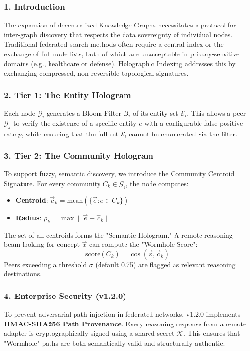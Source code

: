 \documentclass[10pt,journal,compsoc]{IEEEtran}
\begin{document}
\subsubsection{1. Introd\-uction}
The expansion of decen\-tralized Knowledge Graphs neces\-sitates a protocol for inter-graph discovery that respects the data sovereignty of individual nodes. Traditional federated search methods often require a central index or the exchange of full node lists, both of which are unacc\-eptable in privacy-sensitive domains (e.g., healthcare or defense). Holographic Indexing addresses this by exchanging compressed, non-reversible topological signatures.

\subsubsection{2. Tier 1: The Entity Hologram}
Each node $\mathcal{G}_i$ generates a Bloom Filter $B_i$ of its entity set $\mathcal{E}_i$. This allows a peer $\mathcal{G}_j$ to verify the existence of a specific entity $e$ with a confi\-gurable false-positive rate $p$, while ensuring that the full set $\mathcal{E}_i$ cannot be enumerated via the filter.

\subsubsection{3. Tier 2: The Community Hologram}
To support fuzzy, semantic discovery, we introduce the Community Centroid Signature. For every community $C_k \in \mathcal{G}_i$, the node computes:
\begin{itemize}
\item \textbf{Centroid}: $\vec{c}_k = \text{mean}(\{\vec{e} : e \in C_k\})$
\item \textbf{Radius}: $\rho_k = \max \|\vec{e} - \vec{c}_k\|$

\end{itemize}
The set of all centroids forms the "Semantic Hologram." A remote reasoning beam looking for concept $\vec{x}$ can compute the "Wormhole Score":
\begin{equation}
\text{score}(C_k) = \cos(\vec{x}, \vec{c}_k)
\end{equation}
Peers exceeding a threshold $\sigma$ (default 0.75) are flagged as relevant reasoning desti\-nations.

\subsubsection{4. Enterprise Security (v1.2.0)}
To prevent adversarial path injection in federated networks, v1.2.0 implements \textbf{HMAC-SHA256 Path Provenance}. Every reasoning response from a remote adapter is crypt\-ographically signed using a shared secret $\mathcal{K}$. This ensures that "Wormhole" paths are both seman\-tically valid and struc\-turally authentic.
\end{document}
